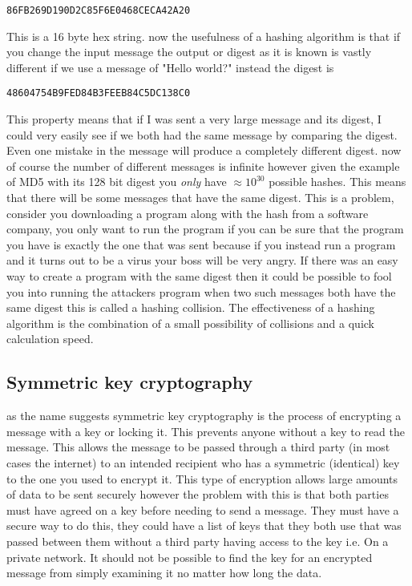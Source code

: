 \documentclass[12pt]{article}
\begin{document}
\begin{center}
{\tt 86FB269D190D2C85F6E0468CECA42A20}
\end{center}

This is a 16 byte hex string. now the usefulness of a hashing algorithm
is that if you change the input message the output or digest as it is known
is vastly different if we use a message of "Hello world?" instead the digest
is 

\begin{center}
{\tt 48604754B9FED84B3FEEB84C5DC138C0}
\end{center}

This property means that if I was sent a very large message and its digest,
 I could very easily see if we both had
the same message by comparing the digest. Even one mistake in the message
will produce a completely different digest.
now of course the number of different messages is infinite however given
the example of MD5 with its 128 bit digest you \textit{only} have  $\approx10^{30}$
possible hashes. This means that there will be some messages that have the
same digest. This is a problem, consider you downloading a program along
with the hash from a software company, you only want to run the program if
you can be sure that the program you have is exactly the one that was sent
because if you instead run a program and it turns out to be a virus your boss
will be very angry. If there was an easy way to create a program with the
same digest then it could be possible to fool you into running the attackers program
when two such messages both have the same digest this is called a hashing
collision. The effectiveness of a hashing algorithm is the combination of
a small possibility of collisions and a quick calculation speed.

\subsection{Symmetric key cryptography}
as the name suggests symmetric key cryptography is the process of encrypting a
message with a key or locking it. This prevents anyone without a key to
read the message. This allows the message to be passed through a third
party (in most cases the internet) to an intended recipient who has a
symmetric (identical) key to the one you used to encrypt it. This type
of encryption allows large amounts of data to be sent securely however
the problem with this is that both parties must have agreed on a key before
needing to send a message. They must have a secure way to do this, they
could have a list of keys that they both use that was passed between
them without a third party having access to the key i.e. On a private
network. It should not be possible to find the key for an encrypted
message from simply examining it no matter how long the data.
\end{document}
